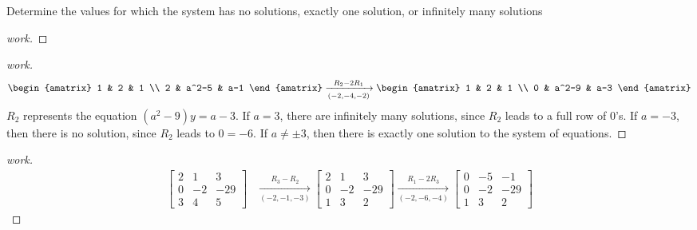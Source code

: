 \documentclass{article}
\begin{document}
\begin{question}{1.2}{Determine the values for which the system has no solutions, exactly one solution, or infinitely many solutions}
\begin{proof}[work]
  \end{proof}
  \begin{proof}[work]
    \begin{align*}
      \begin{amatrix}{2}
        1 & 2     & 1 \\
        2 & a^2-5 & a-1
      \end{amatrix} \xrightarrow[(-2,-4,-2)]{R_2 - 2R_1}
      \begin{amatrix}{2}
        1 & 2     & 1 \\
        0 & a^2-9 & a-3
      \end{amatrix}
    \end{align*}
    $R_2$ represents the equation $(a^2-9)y = a-3$. If $a = 3$, there are infinitely many solutions, since $R_2$ leads to a full row of $0$'s. If $a = -3$, then there is no solution, since $R_2$ leads to $0 = -6$. If $a \neq \pm 3$, then there is exactly one solution to the system of equations.
  \end{proof}
  \begin{proof}[work]
    \begin{align*}
      \begin{bmatrix}
        2 & 1  & 3   \\
        0 & -2 & -29 \\
        3 & 4  & 5
      \end{bmatrix} & \xrightarrow[(-2,-1,-3)]{R_3 - R_2}
      \begin{bmatrix}
        2 & 1  & 3   \\
        0 & -2 & -29 \\
        1 & 3  & 2
      \end{bmatrix} \xrightarrow[(-2,-6,-4)]{R_1 - 2R_3}
      \begin{bmatrix}
        0 & -5 & -1  \\
        0 & -2 & -29 \\
        1 & 3  & 2

\end{bmatrix}
\end{align*}
\end{proof}
\end{question}
\end{document}
